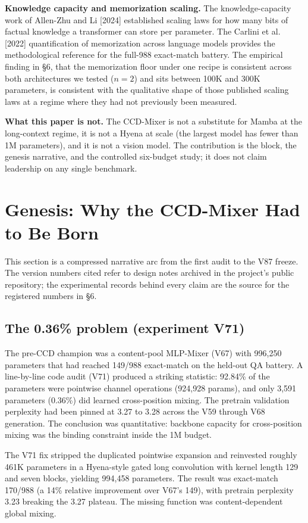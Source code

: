 \documentclass[11pt]{article}
\begin{document}
\textbf{Knowledge capacity and memorization scaling.} The knowledge-capacity work of Allen-Zhu and Li [2024] established scaling laws for how many bits of factual knowledge a transformer can store per parameter. The Carlini et al. [2022] quantification of memorization across language models provides the methodological reference for the full-988 exact-match battery. The empirical finding in \S6, that the memorization floor under one recipe is consistent across both architectures we tested ($n = 2$) and sits between 100K and 300K parameters, is consistent with the qualitative shape of those published scaling laws at a regime where they had not previously been measured.

\textbf{What this paper is not.} The CCD-Mixer is not a substitute for Mamba at the long-context regime, it is not a Hyena at scale (the largest model has fewer than 1M parameters), and it is not a vision model. The contribution is the block, the genesis narrative, and the controlled six-budget study; it does not claim leadership on any single benchmark.

\section{Genesis: Why the CCD-Mixer Had to Be Born}

This section is a compressed narrative arc from the first audit to the V87 freeze. The version numbers cited refer to design notes archived in the project's public repository; the experimental records behind every claim are the source for the registered numbers in \S6.

\subsection{The 0.36\% problem (experiment V71)}

The pre-CCD champion was a content-pool MLP-Mixer (V67) with 996,250 parameters that had reached 149/988 exact-match on the held-out QA battery. A line-by-line code audit (V71) produced a striking statistic: 92.84\% of the parameters were pointwise channel operations (924,928 params), and only 3,591 parameters (0.36\%) did learned cross-position mixing. The pretrain validation perplexity had been pinned at 3.27 to 3.28 across the V59 through V68 generation. The conclusion was quantitative: backbone capacity for cross-position mixing was the binding constraint inside the 1M budget.

The V71 fix stripped the duplicated pointwise expansion and reinvested roughly 461K parameters in a Hyena-style gated long convolution with kernel length 129 and seven blocks, yielding 994,458 parameters. The result was exact-match 170/988 (a 14\% relative improvement over V67's 149), with pretrain perplexity 3.23 breaking the 3.27 plateau. The missing function was content-dependent global mixing.
\end{document}
